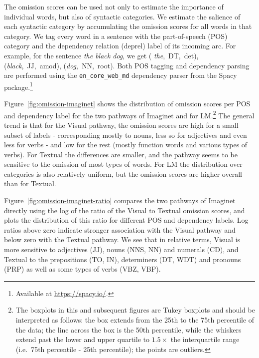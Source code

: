 The omission scores can be used not only to
estimate the importance of individual words, but also of syntactic
categories. We estimate the salience of each syntactic category by
accumulating the omission scores for all words in that category. We
tag every word in a sentence with the part-of-speech (POS) category
and the dependency relation (deprel) label of its incoming arc. For
example, for the sentence \emph{the black dog}, we get ({\it
  the},~DT,~det), 
({\it black},~JJ,~amod), ({\it dog},~NN,~root). 
Both POS tagging and dependency parsing are performed 
using the  \verb+en_core_web_md+ dependency parser from the Spacy package.\footnote{Available at
  \url{https://spacy.io/}.} 


Figure~\ref{fig:omission-imaginet} shows the distribution of omission
scores per POS and dependency label for the two pathways of {\sc
  Imaginet} and for {\sc LM}.\footnote{The boxplots in this and
  subsequent figures are Tukey boxplots and should be interpreted as follows: the box extends
from the 25th to the 75th percentile of the data; the line across the
box is the 50th percentile, while the whiskers extend past the lower
and upper quartile to $1.5\times$
the interquartile range (i.e.\ 75th percentile - 25th percentile); the
points are outliers.\label{ft:boxplots}}  The general trend is that for the {\sc
  Visual} pathway, the omission scores are high for a small subset of
labels - corresponding mostly to nouns, less so for adjectives and
even less for verbs - and low for the rest (mostly function words and
various types of verbs). For {\sc Textual} the differences
are \label{edit:textualomission} smaller, and the pathway seems to be
sensitive to the omission of most types of words.  For {\sc LM} the
distribution over categories is also relatively uniform, but the omission scores are higher
overall than for {\sc Textual}.

Figure~\ref{fig:omission-imaginet-ratio} compares the two pathways of
{\sc Imaginet} directly using the log of the ratio of the {\sc Visual}
to {\sc Textual} omission scores, and plots the distribution of this
ratio for different POS and dependency labels.  Log ratios above zero
indicate stronger association with the {\sc Visual} pathway and below
zero with the {\sc Textual} pathway. We see that in relative terms,
{\sc Visual} is more sensitive to adjectives (JJ), nouns (NNS, NN) and
numerals (CD), and {\sc Textual} to the prepositions (TO, IN),
determiners (DT, WDT) and pronouns (PRP) as well as some types of
verbs (VBZ, VBP).

